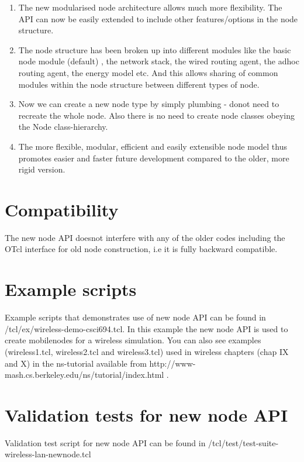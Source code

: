 \begin{enumerate}
\item
The new modularised node architecture allows much more flexibility.
The API can now be easily extended to include other features/options in the
node structure. 
\item
The node structure has been broken up into different modules like the
basic node module (default) , the network stack, the wired routing
agent, the adhoc routing agent, the energy model etc. And this allows
sharing of common modules within the node structure between different
types of node.
\item
Now we can create a new node type by simply plumbing - donot need to
recreate the whole node. Also there is no need to create node classes
obeying the Node class-hierarchy. 
\item
The more flexible, modular, efficient and easily extensible node model
thus promotes easier and faster future development compared to the older,
more rigid version.
\end{enumerate}


\section{Compatibility}
\label{sec:compat}

The new node API doesnot interfere with any of the older codes including
the OTcl interface for old node construction, i.e it is fully backward
compatible.


\section{Example scripts}
\label{sec:ex}

Example scripts that demonstrates use of new node API can be found in
\ns/tcl/ex/wireless-demo-csci694.tcl. In this example the new node API is
used to create mobilenodes for a  wireless simulation. You can also see
examples (wireless1.tcl, wireless2.tcl and wireless3.tcl) used in wireless
chapters (chap IX and X) in the ns-tutorial available from 
http://www-mash.cs.berkeley.edu/ns/tutorial/index.html .


\section{Validation tests for new node API}
\label{sec:valid-test}

Validation test script for new node API can be found in
\ns/tcl/test/test-suite-wireless-lan-newnode.tcl 

